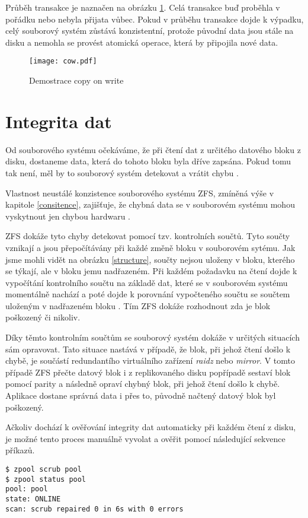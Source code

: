 Průběh transakce je naznačen na obrázku \ref{cow}. Celá transakce buď proběhla v pořádku nebo nebyla přijata vůbec. Pokud v průběhu transakce dojde k výpadku, celý souborový systém zůstává konzistentní, protože původní data jsou stále na disku a nemohla se provést atomická operace, která by připojila nové data.
\begin{figure}[h]
    \caption{Demostrace copy on write}
    \label{cow}
    \texttt{[image: cow.pdf]}
\end{figure}
\section{Integrita dat}
\label{checksum}
Od souborového systému očekáváme, že při čtení dat z určitého datového bloku z disku, dostaneme data, která do tohoto bloku byla dříve zapsána. Pokud tomu tak není, měl by to souborový systém detekovat a vrátit chybu \cite{integrity1}.

Vlastnost neustálé konzistence souborového systému ZFS, zmíněná výše v kapitole \ref{consitence}, zajišťuje, že chybná data se v souborovém systému mohou vyskytnout jen chybou hardwaru \cite{integrity2}.

ZFS dokáže tyto chyby detekovat pomocí tzv. kontrolních součtů. Tyto součty vznikají a jsou přepočítávány při každé změně bloku v souborovém sytému. Jak jsme mohli vidět na obrázku \ref{structure}, součty nejsou uloženy v bloku, kterého se týkají, ale v bloku jemu nadřazeném. Při každém požadavku na čtení dojde k vypočítání kontrolního součtu na základě dat, které se v souborovém systému momentálně nachází a poté dojde k porovnání vypočteného součtu se součtem uloženým v nadřazeném bloku \cite{integrity1}. Tím ZFS dokáže rozhodnout zda je blok poškozený či nikoliv.

Díky těmto kontrolním součtům se souborový systém dokáže v určitých situacích sám opravovat. Tato situace nastává v případě, že blok, při jehož čtení došlo k chybě, je součástí redundantího virtuálního zařízení \emph{raidz} nebo \emph{mirror}. V tomto případě ZFS přečte datový blok i z replikovaného disku popřípadě sestaví blok pomocí parity a následně opraví chybný blok, při jehož čtení došlo k chybě. Aplikace dostane správná data i přes to, původně načtený datový blok byl poškozený.

Ačkoliv dochází k ověřování integrity dat automaticky při každém čtení z disku, je možné tento proces manuálně vyvolat a ověřit pomocí následující sekvence příkazů.
\begin{verbatim}
$ zpool scrub pool
$ zpool status pool
pool: pool
state: ONLINE
scan: scrub repaired 0 in 6s with 0 errors
\end{verbatim}

